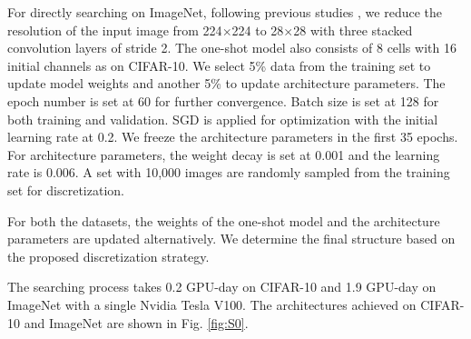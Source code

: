 \documentclass[journal]{IEEEtran}
\begin{document}
For directly searching on ImageNet, following previous studies \cite{DBLP:journals/corr/abs-1909-06035, DBLP:journals/corr/abs-1907-05737}, we reduce the resolution of the input image from 224$\times$224 to 28$\times$28 with three stacked convolution layers of stride 2. The one-shot model also consists of 8 cells with 16 initial channels as on CIFAR-10. We select 5\% data from the training set to update model weights and another 5\% to update architecture parameters. The epoch number is set at 60 for further convergence. Batch size is set at 128 for both training and validation. SGD is applied for optimization with the initial learning rate at 0.2. We freeze the architecture parameters in the first 35 epochs. For architecture parameters, the weight decay is set at 0.001 and the learning rate is 0.006. A set with 10,000 images are randomly sampled from the training set for discretization.

For both the datasets, the weights of the one-shot model and the architecture parameters are updated alternatively. We determine the final structure based on the proposed discretization strategy. 

The searching process takes 0.2 GPU-day on CIFAR-10 and 1.9 GPU-day on ImageNet with a single Nvidia Tesla V100. The architectures achieved on CIFAR-10 and ImageNet are shown in Fig. \ref{fig:S0}. 


\begin{figure*}[!htbp]
   \caption{Visualization of the normal cell (a) (c) and the reduction cell (b) (d) learned on CIFAR-10 and ImageNet.}
\label{fig:S0}
\end{figure*}
\end{document}
